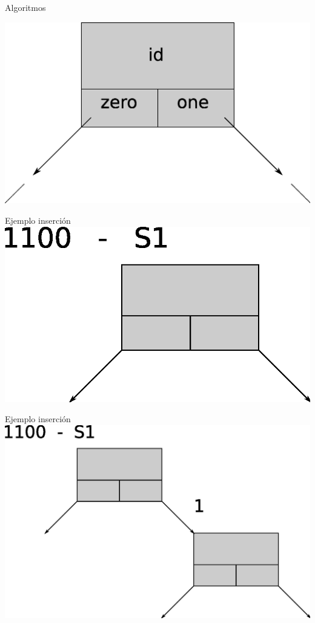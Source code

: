 \documentclass[xcolor=dvipsnames]{beamer}
\begin{document}
\begin{frame}{Algoritmos}

	\center	
	\includegraphics[scale=0.50]{figures/utlimp.eps}  

\end{frame}

\begin{frame}{Ejemplo inserción} 
\center	
\includegraphics[scale=0.30]{figures/lluinsert01.eps} 
\end{frame}

\begin{frame}{Ejemplo inserción} 
\center	
\includegraphics[scale=0.30]{figures/lluinsert02.eps} 
\end{frame}
\end{document}
